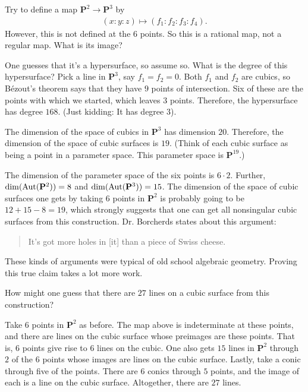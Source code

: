 \documentclass [11 pt, oneside] {article}
\begin{document}
Try to define a map $\mathbf{P}^2 \longrightarrow \mathbf{P}^3$ by 
\begin{align*}
	(x:y:z)\longmapsto  (f_1:f_2:f_3:f_4).
\end{align*}
However, this is not defined at the $6$ points. So this is a rational map, not a regular map. What is its image?

One guesses that it's a hypersurface, so assume so. What is the degree of this hypersurface? Pick a line in $\mathbf{P}^3$, say $f_1=f_2=0$. Both $f_1$ and $f_2$ are cubics, so B\'ezout's theorem says that they have $9$ points of intersection. Six of these are the points with which we started, which leaves $3$ points. Therefore, the hypersurface has degree $168$. (Just kidding: It has degree $3$).

The dimension of the space of cubics in $\mathbf{P}^3$ has dimension $20$. Therefore, the dimension of the space of cubic surfaces is $19$.  (Think of each cubic surface as being a point in a parameter space. This parameter space is $\mathbf{P}^{19}$.) 

The dimension of the parameter space of the six points is $6\cdot 2$. Further, $\dim (\operatorname{Aut}(\mathbf{P}^2))=8$ and $\dim(\operatorname{Aut}(\mathbf{P}^3)) =15$. The dimension of the space of cubic surfaces one gets by taking $6$ points in $\mathbf{P}^2$ is probably going to be $12+15-8=19$, which strongly suggests that one can get all nonsingular cubic surfaces from this construction. Dr. Borcherds states about this argument:
\begin{quote}
	\small 
	It's got more holes in [it] than a piece of Swiss cheese.
\end{quote}

These kinds of arguments were typical of old school algebraic geometry. Proving this true claim takes a lot more work.

\begin{problem}
	How might one guess that there are $27$ lines on a cubic surface from this construction?
\end{problem}

Take $6$ points in $\mathbf{P}^2$ as before. The map above is indeterminate at these points, and there are lines on the cubic surface whose preimages are these points. That is, $6$ points give rise to $6$ lines on the cubic. One also gets $15$ lines in $\mathbf{P}^2$ through $2$ of the $6$ points whose images are lines on the cubic surface. Lastly, take a conic through five of the points. There are $6$ conics through $5$ points, and the image of each is a line on the cubic surface. Altogether, there are $27$ lines.
\end{document}
